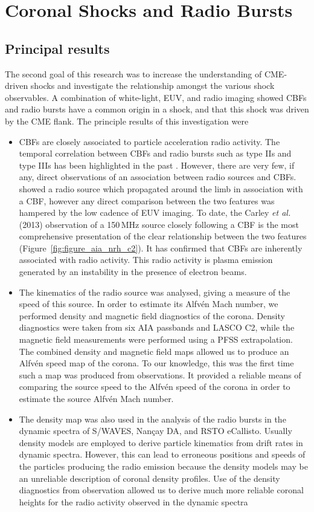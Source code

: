 \section{Coronal Shocks and Radio Bursts}

\subsection{Principal results}
The second goal of this research was to increase the understanding of CME-driven shocks and investigate the relationship amongst the various shock observables. A combination of white-light, EUV, and radio imaging showed CBFs and radio bursts have a common origin in a shock, and that this shock was driven by the CME flank. The principle results of this investigation were
\begin{itemize}
\item CBFs are closely associated to particle acceleration radio activity. The temporal correlation between CBFs and radio bursts such as type IIs and type IIIs has been highlighted in the past \citep{klassen2000, maia2004}. However, there are very few, if any, direct observations of an association between radio sources and CBFs. \citet{vrsnak2005a} showed a radio source which propagated around the limb in association with a CBF, however any direct comparison between the two features was hampered by the low cadence of EUV imaging. To date, the Carley {\it et al.} (2013) observation of a 150\,MHz source closely following a CBF is the most comprehensive presentation of the clear relationship between the two features (Figure~\ref{fig:figure_aia_nrh_c2}). It has confirmed that CBFs are inherently associated with radio activity. This radio activity is plasma emission generated by an instability in the presence of electron beams.
\item The kinematics of the radio source was analysed, giving a measure of the speed of this source. In order to estimate its Alfv\'{e}n Mach number, we performed density and magnetic field diagnostics of the corona. Density diagnostics were taken from six AIA passbands and LASCO C2, while the magnetic field measurements were performed using a PFSS extrapolation. The combined density and magnetic field maps allowed us to produce an Alfv\'{e}n speed map of the corona. To our knowledge, this was the first time such a map was produced from observations. It provided a reliable means of comparing the source speed to the Alfv\'{e}n speed of the corona in order to estimate the source Alfv\'{e}n Mach number.
\item The density map was also used in the analysis of the radio bursts in the dynamic spectra of S/WAVES, Nan\c{c}ay DA, and RSTO eCallisto. Usually density models are employed to derive particle kinematics from drift rates in dynamic spectra. However, this can lead to erroneous positions and speeds of the particles producing the radio emission because the density models may be an unreliable description of coronal density profiles. Use of the density diagnostics from observation allowed us to derive much more reliable coronal heights for the radio activity observed in the dynamic spectra

\end{itemize}
